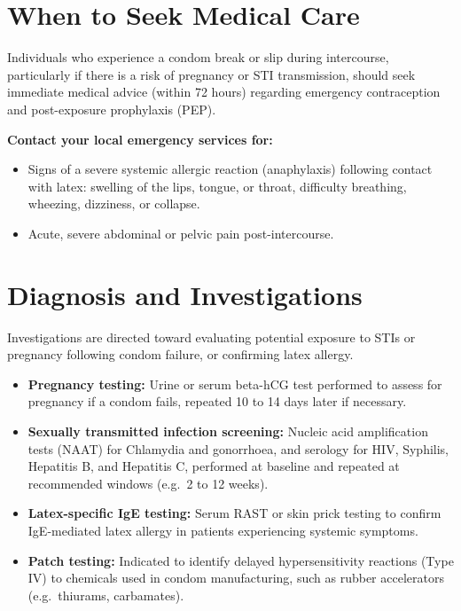 \section*{When to Seek Medical Care}
Individuals who experience a condom break or slip during intercourse, particularly if there is a risk of pregnancy or STI transmission, should seek immediate medical advice (within 72 hours) regarding emergency contraception and post-exposure prophylaxis (PEP).

\textbf{Contact your local emergency services for:}
\begin{itemize}
    \item Signs of a severe systemic allergic reaction (anaphylaxis) following contact with latex: swelling of the lips, tongue, or throat, difficulty breathing, wheezing, dizziness, or collapse.
    \item Acute, severe abdominal or pelvic pain post-intercourse.
\end{itemize}

\section*{Diagnosis and Investigations}
Investigations are directed toward evaluating potential exposure to STIs or pregnancy following condom failure, or confirming latex allergy.
\begin{itemize}
    \item \textbf{Pregnancy testing:} Urine or serum beta-hCG test performed to assess for pregnancy if a condom fails, repeated 10 to 14 days later if necessary.
    \item \textbf{Sexually transmitted infection screening:} Nucleic acid amplification tests (NAAT) for Chlamydia and gonorrhoea, and serology for HIV, Syphilis, Hepatitis B, and Hepatitis C, performed at baseline and repeated at recommended windows (e.g.\ 2 to 12 weeks).
    \item \textbf{Latex-specific IgE testing:} Serum RAST or skin prick testing to confirm IgE-mediated latex allergy in patients experiencing systemic symptoms.
    \item \textbf{Patch testing:} Indicated to identify delayed hypersensitivity reactions (Type IV) to chemicals used in condom manufacturing, such as rubber accelerators (e.g.\ thiurams, carbamates).
\end{itemize}

